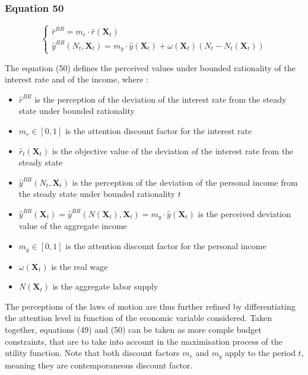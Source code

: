 \documentclass{article}
\begin{document}
\subsubsection*{Equation 50}

\begin{equation}\tag{50}
    \begin{cases}
        \hat{r}^{BR} = m_{r}\cdot\hat{r}(\textbf{X}_{t}) \\
        \hat{y}^{BR}(N_{t},\textbf{X}_{t}) = m_{y}\cdot\hat{y}(\textbf{X}_{t})+\omega(\textbf{X}_{t})(N_{t}-N_{t}(\textbf{X}_{t}))
    \end{cases}
\end{equation}

The equation (50) defines the perceived values under bounded rationality of the interest rate and of the income, where : 
\begin{itemize}
    \item $\hat{r}^{BR}$ is the perception of the deviation of the interest rate from the steady state under bounded rationality
    \item $m_{r}\in\left[0,1\right]$ is the attention discount factor for the interest rate
    \item $\hat{r}_{t}(\textbf{X}_{t})$ is the objective value of the deviation of the interest rate from the steady state 
    
    \item $\hat{y}^{BR}(N_{t},\textbf{X}_{t})$ is the perception of the deviation of the personal income from the steady state under bounded rationality $t$
    \item $\hat{y}^{BR}(\textbf{X}_{t})=\hat{y}^{BR}(N(\textbf{X}_{t}),\textbf{X}_{t})=m_{y}\cdot\hat{y}(\textbf{X}_{t})$ is the perceived deviation value of the aggregate income
    \item $m_{y}\in\left[0,1\right]$ is the attention discount factor for the personal income
    \item $\omega(\textbf{X}_{t})$ is the real wage
    \item $N(\textbf{X}_{t})$ is the aggregate labor supply
\end{itemize}
The perceptions of the laws of motion are thus further refined by differentiating the attention level in function of the economic variable considered. 
Taken together, equations (49) and (50) can be taken as more comple budget constraints, that are to take into account in the maximisation process of the utility function.
Note that both discount factors $m_{r}$ and $m_{y}$ apply to the period $t$, meaning they are contemporaneous discount factor. 
\end{document}

